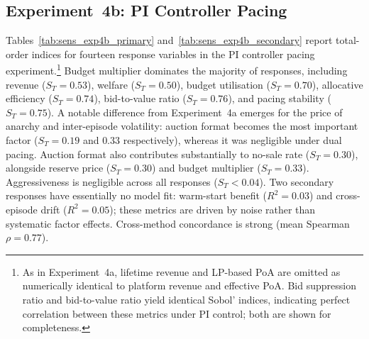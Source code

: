 \begin{table}[H]
\centering
\caption{Experiment~4a: Total-order Sobol' indices ($S_T$) for stability and dynamics responses. $R^2$: pacing stability 0.62, entropy 0.87, warm start 0.48, inter-episode volatility 0.28, bid-to-value 0.12, bid suppression 0.12, cross-episode drift 0.12.}
\label{tab:sens_exp4a_secondary}
\small
{}
\end{table}

\subsection{Experiment~4b: PI Controller Pacing}
\label{sec:sens_exp4b}

Tables~\ref{tab:sens_exp4b_primary} and~\ref{tab:sens_exp4b_secondary} report total-order indices for fourteen response variables in the PI controller pacing experiment.\footnote{As in Experiment~4a, lifetime revenue and LP-based PoA are omitted as numerically identical to platform revenue and effective PoA. Bid suppression ratio and bid-to-value ratio yield identical Sobol' indices, indicating perfect correlation between these metrics under PI control; both are shown for completeness.} Budget multiplier dominates the majority of responses, including revenue ($S_T = 0.53$), welfare ($S_T = 0.50$), budget utilisation ($S_T = 0.70$), allocative efficiency ($S_T = 0.74$), bid-to-value ratio ($S_T = 0.76$), and pacing stability ($S_T = 0.75$). A notable difference from Experiment~4a emerges for the price of anarchy and inter-episode volatility: auction format becomes the most important factor ($S_T = 0.19$ and $0.33$ respectively), whereas it was negligible under dual pacing. Auction format also contributes substantially to no-sale rate ($S_T = 0.30$), alongside reserve price ($S_T = 0.30$) and budget multiplier ($S_T = 0.33$). Aggressiveness is negligible across all responses ($S_T < 0.04$). Two secondary responses have essentially no model fit: warm-start benefit ($R^2 = 0.03$) and cross-episode drift ($R^2 = 0.05$); these metrics are driven by noise rather than systematic factor effects. Cross-method concordance is strong (mean Spearman $\rho = 0.77$).

